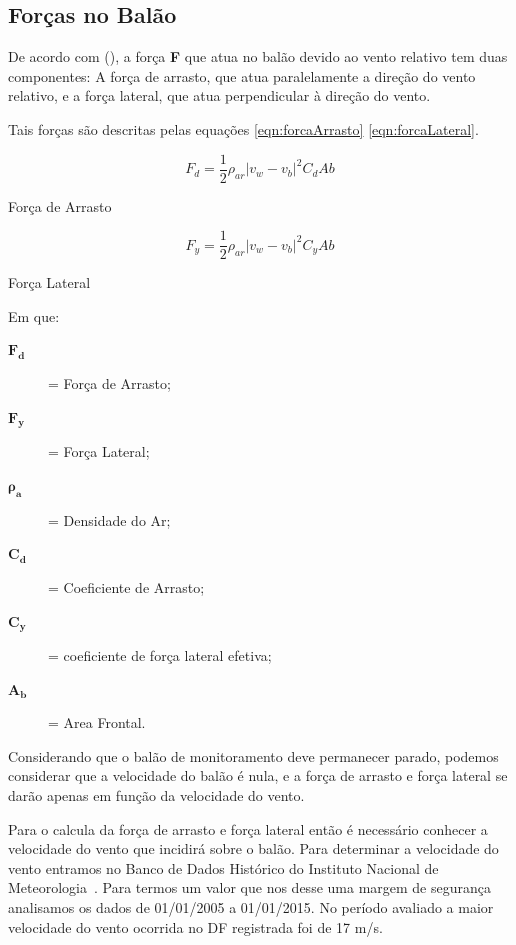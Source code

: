 \subsection{Forças no Balão} %
\label{sub:for_as_no_bal_o}

De acordo com  (\citeyear{yajima}), a força \textbf{F} que atua no balão devido ao vento relativo tem duas componentes: A força de arrasto, que atua paralelamente a direção do vento relativo, e a força lateral, que atua perpendicular à direção do vento.

Tais forças são descritas pelas equações \eqref{eqn:forcaArrasto} \eqref{eqn:forcaLateral}.

	\begin{equacao}
		\begin{equation}
			F_{d} = \frac{1}{2} \rho_{ar} \left | v_{w} - v_{b} \right |^{2} C_{d}A{b}
		\end{equation}
		\caption[Força de arrasto]{Força de Arrasto~\cite{yajima}}
		\label{eqn:forcaArrasto}
	\end{equacao}

	\begin{equacao}
		\begin{equation}
			F_{y} = \frac{1}{2} \rho_{ar} \left | v_{w} - v_{b} \right |^{2} C_{y}A{b}
		\end{equation}
		\caption[Força lateral]{Força Lateral~\cite{yajima}}
		\label{eqn:forcaLateral}
	\end{equacao}

	Em que:
	\begin{description}
		\item[$\boldsymbol{F_{d}}$] = Força de Arrasto;
		\item[$\boldsymbol{F_{y}}$] = Força Lateral;
		\item[$\boldsymbol{\rho_{a}}$] = Densidade do Ar;
		\item[$\boldsymbol{C_{d}}$] = Coeficiente de Arrasto;
		\item[$\boldsymbol{C_{y}}$] = coeficiente de força lateral efetiva;
		\item[$\boldsymbol{A_{b}}$] = Area Frontal.
	\end{description}

	Considerando que o balão de monitoramento deve permanecer parado, podemos considerar que a velocidade do balão é nula, e a força de arrasto e força lateral se darão apenas em função da velocidade do vento.

	Para o calcula da força de arrasto e força lateral então é necessário conhecer a velocidade do vento que incidirá sobre o balão. Para determinar a velocidade do vento entramos no Banco de Dados Histórico do Instituto Nacional de Meteorologia~\cite{inmet}. Para termos um valor que nos desse uma margem de segurança analisamos os dados de 01/01/2005 a 01/01/2015. No período avaliado a maior velocidade do vento ocorrida no DF registrada foi de 17 m/s.


